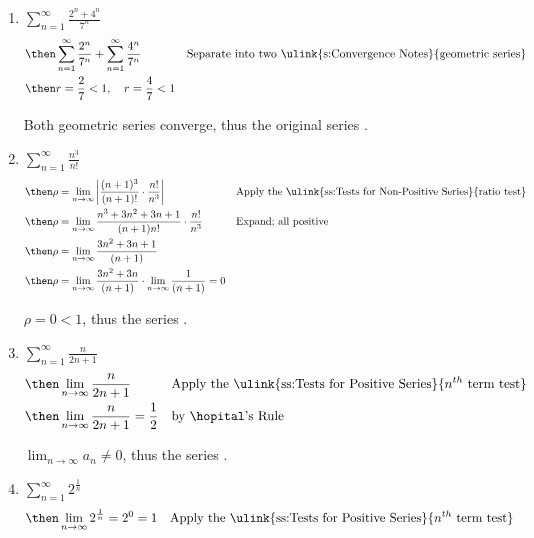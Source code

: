 \begin{enumerate}[itemsep=3em]
  \item \(\displaystyle \sum_{n=1}^{\infty} \frac{2^n + 4^n }{7^n}\)
    \begin{align*}
      &\then
      \sum_{n=1}^{\infty} \frac{2^n}{7^n} +
      \sum_{n=1}^{\infty} \frac{4^n }{7^n}
      && \text{Separate into two \ulink{s:Convergence Notes}{geometric series}} \\
      &\then
      r = \frac{2}{7} < 1, \quad r = \frac{4}{7} < 1
    \end{align*}

    Both geometric series converge, thus the original series .

  \item \(\displaystyle \sum_{n=1}^{\infty} \frac{n^3}{n!} \)
    \begin{align*}
      &\then \rho = \lim_{n \to \infty} \left| \frac{(n+1)^3}{(n+1)!} \cdot
      \frac{n!}{n^3} \right|
      && \text{Apply the \ulink{ss:Tests for Non-Positive Series}{ratio test}} \\
      &\then \rho = \lim_{n \to \infty} \frac{n^3 + 3n^2 + 3n + 1}{(n+1)n!} \cdot
      \frac{n!}{n^3}
      && \text{Expand; all positive} \\
      &\then \rho = \lim_{n \to \infty} \frac{3n^2 + 3n + 1}{(n+1)} \\
      &\then \rho = \lim_{n \to \infty} \frac{3n^2 + 3n}{(n+1)} \cdot
      \lim_{n \to \infty} \frac{1}{(n+1)} = 0
    \end{align*}

    \(\rho = 0 < 1\), thus the series .

  \item \(\displaystyle \sum_{n=1}^{\infty} \frac{n}{2n+1} \)
    \begin{align*}
      &\then \lim_{n \to \infty} \frac{n}{2n+1}
      && \text{Apply the \ulink{ss:Tests for Positive Series}{\(n^{th} \) term test}} \\
      &\then \lim_{n \to \infty} \frac{n}{2n+1} = \frac{1}{2}
      && \text{by \hopital's Rule}
    \end{align*}

    \(\lim_{n \to \infty} a_n \neq 0\), thus the series .

  \item \(\displaystyle \sum_{n=1}^{\infty} 2^\frac{1}{n} \)
    \begin{align*}
      &\then \lim_{n \to \infty} 2^{\frac{1}{n}} = 2^0 = 1
      && \text{Apply the \ulink{ss:Tests for Positive Series}{\(n^{th} \) term test}}
    \end{align*}


\end{enumerate}
